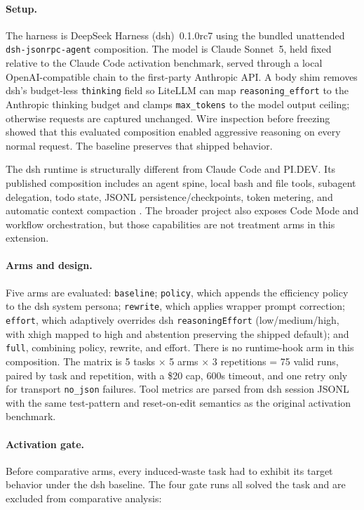 \documentclass[11pt]{article}
\newcommand{\pidev}{PI.DEV}
\newcommand{\citep}[1]{\cite{#1}}
\newcommand{\cc}{Claude Code}
\begin{document}
\paragraph{Setup.} The harness is DeepSeek Harness (dsh)~0.1.0rc7 using the
bundled unattended \texttt{dsh-jsonrpc-agent} composition. The model is
Claude Sonnet~5, held fixed relative to the \cc{} activation benchmark, served
through a local OpenAI-compatible chain to the first-party Anthropic API. A
body shim removes dsh's budget-less \texttt{thinking} field so LiteLLM can map
\texttt{reasoning\_effort} to the Anthropic thinking budget and clamps
\texttt{max\_tokens} to the model output ceiling; otherwise requests are
captured unchanged. Wire inspection before freezing showed that this evaluated
composition enabled aggressive reasoning on every normal request. The
baseline preserves that shipped behavior.

The dsh runtime is structurally different from \cc{} and \pidev{}. Its
published composition includes an agent spine, local bash and file tools,
subagent delegation, todo state, JSONL persistence/checkpoints, token metering,
and automatic context compaction \citep{deepseekharness}. The broader project
also exposes Code Mode and workflow orchestration, but those capabilities are
not treatment arms in this extension.

\paragraph{Arms and design.} Five arms are evaluated: \texttt{baseline};
\texttt{policy}, which appends the efficiency policy to the dsh system persona;
\texttt{rewrite}, which applies wrapper prompt correction;
\texttt{effort}, which adaptively overrides dsh \texttt{reasoningEffort}
(low/medium/high, with xhigh mapped to high and abstention preserving the
shipped default); and \texttt{full}, combining policy, rewrite, and effort.
There is no runtime-hook arm in this composition. The matrix is 5 tasks
$\times$ 5 arms $\times$ 3 repetitions = 75 valid runs, paired by task and
repetition, with a \$20 cap, 600s timeout, and one retry only for transport
\texttt{no\_json} failures. Tool metrics are parsed from dsh session JSONL
with the same test-pattern and reset-on-edit semantics as the original
activation benchmark.

\paragraph{Activation gate.} Before comparative arms, every induced-waste
task had to exhibit its target behavior under the dsh baseline. The four gate
runs all solved the task and are excluded from comparative analysis:
\end{document}
